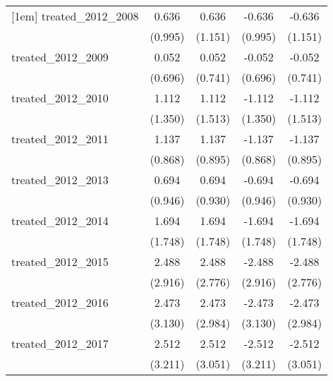 {\begin{tabular}{l*{4}{c}}
[1em]
treated\_2012\_2008&       0.636         &       0.636         &      -0.636         &      -0.636         \\
            &     (0.995)         &     (1.151)         &     (0.995)         &     (1.151)         \\
[1em]
treated\_2012\_2009&       0.052         &       0.052         &      -0.052         &      -0.052         \\
            &     (0.696)         &     (0.741)         &     (0.696)         &     (0.741)         \\
[1em]
treated\_2012\_2010&       1.112         &       1.112         &      -1.112         &      -1.112         \\
            &     (1.350)         &     (1.513)         &     (1.350)         &     (1.513)         \\
[1em]
treated\_2012\_2011&       1.137         &       1.137         &      -1.137         &      -1.137         \\
            &     (0.868)         &     (0.895)         &     (0.868)         &     (0.895)         \\
[1em]
treated\_2012\_2013&       0.694         &       0.694         &      -0.694         &      -0.694         \\
            &     (0.946)         &     (0.930)         &     (0.946)         &     (0.930)         \\
[1em]
treated\_2012\_2014&       1.694         &       1.694         &      -1.694         &      -1.694         \\
            &     (1.748)         &     (1.748)         &     (1.748)         &     (1.748)         \\
[1em]
treated\_2012\_2015&       2.488         &       2.488         &      -2.488         &      -2.488         \\
            &     (2.916)         &     (2.776)         &     (2.916)         &     (2.776)         \\
[1em]
treated\_2012\_2016&       2.473         &       2.473         &      -2.473         &      -2.473         \\
            &     (3.130)         &     (2.984)         &     (3.130)         &     (2.984)         \\
[1em]
treated\_2012\_2017&       2.512         &       2.512         &      -2.512         &      -2.512         \\
            &     (3.211)         &     (3.051)         &     (3.211)         &     (3.051)         \\

\end{tabular}}
